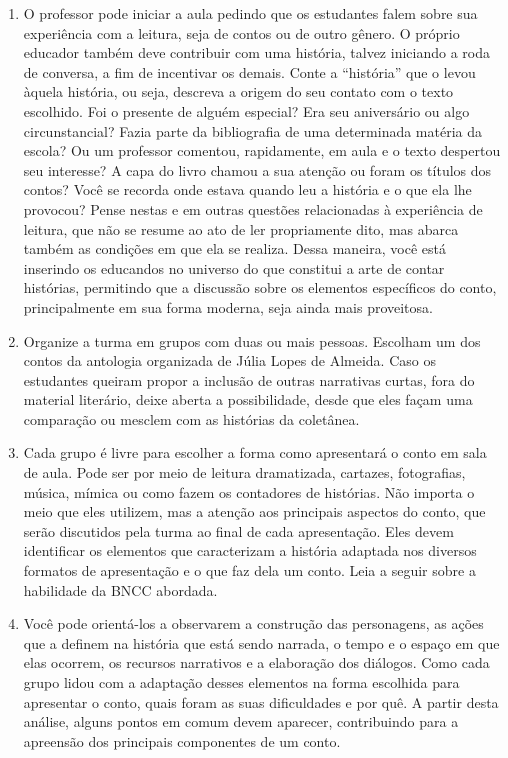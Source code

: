 \documentclass[12pt]{extarticle}
\begin{document}
\begin{enumerate}
\item
O professor pode iniciar a aula pedindo que os
estudantes falem sobre sua experiência com a leitura, seja de contos ou
de outro gênero. O próprio educador também deve contribuir com uma
história, talvez iniciando a roda de conversa, a fim de incentivar os
demais. Conte a ``história'' que o levou àquela história, ou seja,
descreva a origem do seu contato com o texto escolhido. Foi o presente
de alguém especial? Era seu aniversário ou algo circunstancial? Fazia
parte da bibliografia de uma determinada matéria da escola? Ou um
professor comentou, rapidamente, em aula e o texto despertou seu
interesse? A capa do livro chamou a sua atenção ou foram os títulos dos
contos? Você se recorda onde estava quando leu a história e o que ela
lhe provocou? Pense nestas e em outras questões relacionadas à
experiência de leitura, que não se resume ao ato de ler propriamente
dito, mas abarca também as condições em que ela se realiza. Dessa
maneira, você está inserindo os educandos no universo do que constitui a
arte de contar histórias, permitindo que a discussão sobre os elementos
específicos do conto, principalmente em sua forma moderna, seja ainda
mais proveitosa.

\item
Organize a turma em grupos com duas ou mais pessoas. Escolham um dos contos
da antologia organizada de Júlia Lopes de Almeida. Caso os estudantes
queiram propor a inclusão de outras narrativas curtas, fora do material
literário, deixe aberta a possibilidade, desde que eles façam uma
comparação ou mesclem com as histórias da coletânea.

\item
Cada grupo é livre para escolher a forma como apresentará o conto em
sala de aula. Pode ser por meio de leitura dramatizada, cartazes,
fotografias, música, mímica ou como fazem os contadores de histórias.
Não importa o meio que eles utilizem, mas a atenção aos principais
aspectos do conto, que serão discutidos pela turma ao final de cada
apresentação. Eles devem identificar os elementos que caracterizam a
história adaptada nos diversos formatos de apresentação e o que faz dela
um conto. 
Leia a seguir sobre a habilidade da BNCC abordada.


\item
Você pode orientá-los a observarem a construção das personagens, as
ações que a definem na história que está sendo narrada, o tempo e o
espaço em que elas ocorrem, os recursos narrativos e a elaboração dos
diálogos. Como cada grupo lidou com a adaptação desses elementos na
forma escolhida para apresentar o conto, quais foram as suas
dificuldades e por quê. A partir desta análise, alguns pontos em comum
devem aparecer, contribuindo para a apreensão dos principais componentes
de um conto.


\end{enumerate}
\end{document}
